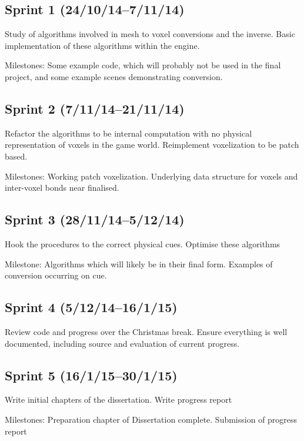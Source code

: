 \subsection*{Sprint 1 (24/10/14--7/11/14)}

Study of algorithms involved in mesh to voxel conversions and the inverse. Basic implementation of these algorithms within the engine.

Milestones: Some example code, which will probably not be
used in the final project, and some example scenes demonstrating conversion.


\subsection*{Sprint 2 (7/11/14--21/11/14)}

Refactor the algorithms to be internal computation with no physical representation of voxels in the game world. Reimplement voxelization to be patch based.  

Milestones: Working patch voxelization. Underlying data structure for voxels and inter-voxel bonds near finalised.


\subsection*{Sprint 3 (28/11/14--5/12/14)}

Hook the procedures to the correct physical cues. Optimise these algorithms

Milestone: Algorithms which will likely be in their final form. Examples of conversion occurring on cue.


\subsection*{Sprint 4 (5/12/14--16/1/15)}

Review code and progress over the Christmas break. Ensure everything is well documented, including source and evaluation of current progress.


\subsection*{Sprint 5 (16/1/15--30/1/15)}

Write initial chapters of the dissertation. Write progress report

Milestones: Preparation chapter of Dissertation complete. Submission of progress report


